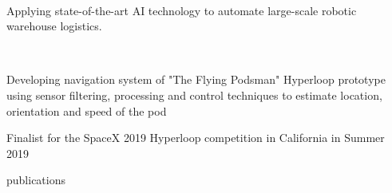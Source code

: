 \documentclass[]{lukas-cv-openfont}
\begin{document}


\vspace{1em}


\noindent
{}
\\
\begin{tightitemize}{1.7em}
    \item Applying state-of-the-art AI technology to automate large-scale robotic warehouse logistics.
\end{tightitemize}
\largesectionsep

\noindent
{}
\\
\begin{tightitemize}{1.7em}
    \item Developing navigation system of "The Flying Podsman" Hyperloop prototype using sensor filtering, processing and control techniques to estimate location, orientation and speed of the pod
    \item Finalist for the SpaceX 2019 Hyperloop competition in California in Summer 2019
\end{tightitemize}
\largesectionsep


\noindent
\vspace{-1em}
\begin{btSect}{publications}
\btPrintNotCited
\end{btSect}

\sectionsep
\end{document}
